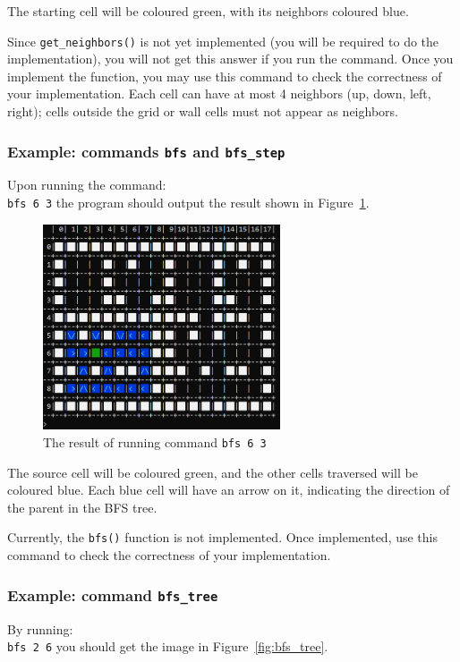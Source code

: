 \documentclass[../en-fa-lab.tex]{subfiles}
\begin{document}
The starting cell will be coloured green, with its neighbors coloured blue.

Since \texttt{get\_neighbors()} is not yet implemented (you will be required to do the implementation), you will not get this answer if you run the command. Once you implement the function, you may use this command to check the correctness of your implementation. Each cell can have at most 4 neighbors (up, down, left, right); cells outside the grid or wall cells must not appear as neighbors.

\subsubsection{Example: commands \texttt{bfs} and \texttt{bfs\_step}}
Upon running the command:\\
\texttt{bfs 6 3}
the program should output the result shown in Figure~\ref{fig:bfs1}.

\begin{figure}[h]
    \centering
    \includegraphics[width=7cm]{../Resources/lab9/grid_bfs1.png}
    \caption{The result of running command \texttt{bfs 6 3}}
    \label{fig:bfs1}
\end{figure}

The source cell will be coloured green, and the other cells traversed will be coloured blue. Each blue cell will have an arrow on it, indicating the direction of the parent in the BFS tree.

Currently, the \texttt{bfs()} function is not implemented. Once implemented, use this command to check the correctness of your implementation.

\subsubsection{Example: command \texttt{bfs\_tree}}
By running:\\
\texttt{bfs 2 6}
you should get the image in Figure~\ref{fig:bfs_tree}.
\end{document}
